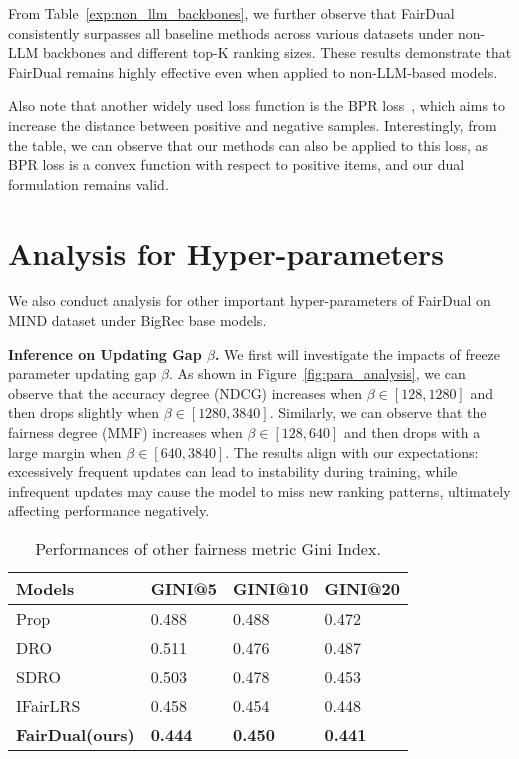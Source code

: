 From Table~\ref{exp:non_llm_backbones}, we further observe that FairDual consistently surpasses all baseline methods across various datasets under non-LLM backbones and different top-K ranking sizes. These results demonstrate that FairDual remains highly effective even when applied to non-LLM-based models.


Also note that another widely used loss function is the BPR loss~\cite{BPR}, which aims to increase the distance between positive and negative samples. Interestingly, from the table, we can observe that our methods can also be applied to this loss, as BPR loss is a convex function with respect to positive items, and our dual formulation remains valid.


\section{Analysis for Hyper-parameters}\label{app:para_analysis}
We also conduct analysis for other important hyper-parameters of FairDual on MIND dataset under BigRec base models.

\textbf{Inference on Updating Gap $\beta$.} We first will investigate the impacts of freeze parameter updating gap $\beta$. As shown in Figure~\ref{fig:para_analysis}, we can observe that the accuracy degree (NDCG) increases when $\beta\in [128, 1280]$ and then drops slightly when $\beta\in [1280,3840]$. Similarly,  we can observe that the fairness degree (MMF) increases when $\beta\in [128, 640]$ and then drops with a large margin when $\beta\in [640,3840]$. 
The results align with our expectations: excessively frequent updates can lead to instability during training, while infrequent updates may cause the model to miss new ranking patterns, ultimately affecting performance negatively.




\begin{table}[t]
\centering
\caption{Performances of other fairness metric Gini Index.}
\label{tab:gini}
\begin{tabular}{llll}
\toprule
Models            & GINI@5   & GINI@10  & GINI@20 \\ \midrule
Prop & 0.488 & 0.488 & 0.472   \\
DRO & 0.511 & 0.476 & 0.487 \\
SDRO & 0.503 & 0.478 & 0.453 \\
IFairLRS & 0.458 & 0.454 & 0.448 \\
\textbf{FairDual(ours)} & \textbf{0.444} & \textbf{0.450} & \textbf{0.441} \\
\bottomrule
\end{tabular}
\end{table}

